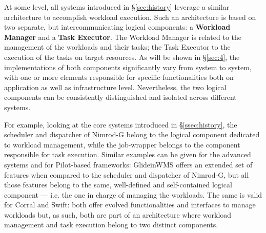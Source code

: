 \documentclass{sig-alternate}
\begin{document}
At some level, all \pilotjob systems introduced in \S\ref{sec:history}
leverage a similar architecture to accomplish workload execution. Such
an architecture is based on two separate, but intercommunicating logical
components: a \textbf{ Workload Manager} and a \textbf{Task   Executor}.
The Workload Manager is related to the management of the workloads and
their tasks; the Task Executor to the execution of the tasks on target
resources.  As will be shown in \S\ref{sec:4}, the implementations of
both components significantly vary from system to system, with one or
more elements responsible for specific functionalities both on
application as well as infrastructure level. Nevertheless, the two
logical components can be consistently distinguished and isolated across
different \pilotjob systems.

For example, looking at the core \pilotjob systems introduced in
\S\ref{ssec:history}, the scheduler and dispatcher of Nimrod-G
 belong to the logical component dedicated to
workload management, while the job-wrapper belongs to the component
responsible for task execution. Similar examples can be given for the
advanced \pilotjob systems and for Pilot-based frameworks: GlideinWMS
 offers an extended set of
features when compared to the scheduler and dispatcher of Nimrod-G, but
all those features belong to the same, well-defined and self-contained
logical component --- i.e. the one in charge of managing the workloads.
The same is valid for Corral and  Swift: both offer evolved functionalities and
interfaces to manage workloads but, as such, both are part of an
architecture where workload management and task execution belong to two
distinct components. 
\end{document}
